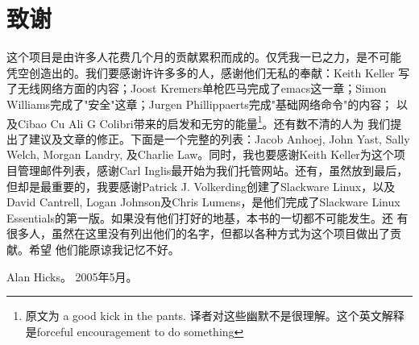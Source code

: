 \section*{致谢}
\label{sec:preface:acknowledgments}

这个项目是由许多人花费几个月的贡献累积而成的。仅凭我一已之力，是不可能
凭空创造出的。我们要感谢许许多多的人，感谢他们无私的奉献：Keith Keller
写了无线网络方面的内容；Joost Kremers单枪匹马完成了emacs这一章；Simon
Williams完成了"安全"这章；Jurgen Phillippaerts完成"基础网络命令"的内容；
以及Cibao Cu Ali G Colibri带来的启发和无穷的能量\footnote{原文为 a
good kick in the pants. 译者对这些幽默不是很理解。这个英文解释是forceful encouragement to do something}。还有数不清的人为
我们提出了建议及文章的修正。下面是一个完整的列表：Jacob Anhoej, John
Yast, Sally Welch, Morgan Landry, 及Charlie Law。同时，我也要感谢Keith
Keller为这个项目管理邮件列表，感谢Carl Inglis最开始为我们托管网站。还有，虽然放到最后，但却是最重要的，我要感谢Patrick J. Volkerding创建了Slackware Linux，以及
David Cantrell, Logan Johnson及Chris Lumens，是他们完成了Slackware
Linux Essentials的第一版。如果没有他们打好的地基，本书的一切都不可能发生。还
有很多人，虽然在这里没有列出他们的名字，但都以各种方式为这个项目做出了贡献。希望
他们能原谅我记忆不好。

Alan Hicks。 2005年5月。




